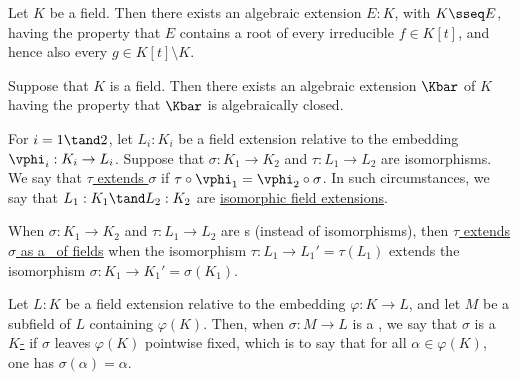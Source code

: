 \documentclass[a4paper]{article}
\begin{document}
\begin{tlemma}
  Let \( K \) be a field. Then there exists an algebraic extension \( E:K \), with \( K\sseq E \), having the property that \( E \) contains a root of every irreducible \( f\in K[t] \), and hence also every \( g\in K[t]\setminus K \).
\end{tlemma}

\begin{ttheorem}
  Suppose that \( K \) is a field.
  Then there exists an algebraic extension \( \Kbar \) of \( K \) having the property that \( \Kbar \) is algebraically closed.
\end{ttheorem}

\begin{tdefinition}
  For \( i = 1 \tand 2 \), let \( L_i : K_i \) be a field extension relative to the embedding \( \vphi_i : K_i\to L_i \).
  Suppose that \( \sigma : K_1\to K_2 \) and \( \tau:L_1\to L_2 \) are isomorphisms.
  We say that \ul{\( \tau \) extends \( \sigma \)} if \( \tau\circ\vphi_1 = \vphi_2\circ\sigma \).
  In such circumstances, we say that \( L_1 : K_1 \tand L_2 : K_2 \) are \ul{isomorphic field extensions}.
  \begin{center}
  \end{center}
  When \( \sigma:K_1\to K_2 \) and \( \tau:L_1\to L_2 \) are \homo s (instead of isomorphisms), then \ul{\( \tau \) extends \( \sigma \) as a \homo~of fields} when the isomorphism \( \tau:L_1\to L_1' = \tau(L_1) \) extends the isomorphism \( \sigma:K_1\to K_1' = \sigma(K_1) \).
\end{tdefinition}

\begin{tdefinition}[\(K\)-\homo]
  Let \( L : K \) be a field extension relative to the embedding \( \varphi : K \to L \), and let \( M \) be a subfield of \( L \) containing \( \varphi(K) \).
  Then, when \( \sigma : M \to L \) is a \homo, we say that \( \sigma \) is a \ul{\(K\)-\homo} if \( \sigma \) leaves \( \varphi(K) \) pointwise fixed, which is to say that for all \( \alpha \in \varphi(K) \), one has \( \sigma(\alpha) = \alpha \).
\end{tdefinition}
\end{document}
